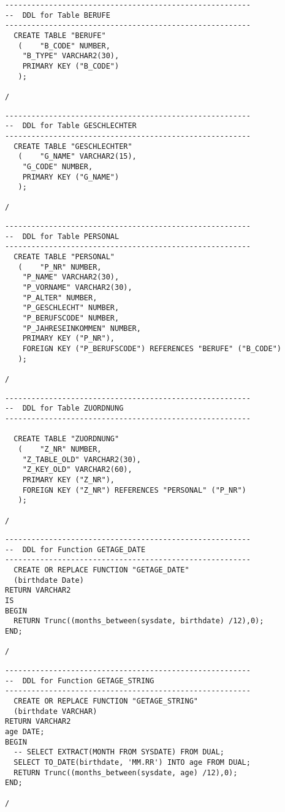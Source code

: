 \documentclass{scrartcl}
\begin{document}
\begin{lstlisting}
--------------------------------------------------------
--  DDL for Table BERUFE
--------------------------------------------------------
  CREATE TABLE "BERUFE" 
   (	"B_CODE" NUMBER, 
	"B_TYPE" VARCHAR2(30),
	PRIMARY KEY ("B_CODE")
   );

/
\end{lstlisting}

\begin{lstlisting}
--------------------------------------------------------
--  DDL for Table GESCHLECHTER
--------------------------------------------------------
  CREATE TABLE "GESCHLECHTER" 
   (	"G_NAME" VARCHAR2(15), 
	"G_CODE" NUMBER,
	PRIMARY KEY ("G_NAME")
   );

/
\end{lstlisting}

\begin{lstlisting}
--------------------------------------------------------
--  DDL for Table PERSONAL
--------------------------------------------------------
  CREATE TABLE "PERSONAL" 
   (	"P_NR" NUMBER, 
	"P_NAME" VARCHAR2(30), 
	"P_VORNAME" VARCHAR2(30), 
	"P_ALTER" NUMBER, 
	"P_GESCHLECHT" NUMBER, 
	"P_BERUFSCODE" NUMBER, 
	"P_JAHRESEINKOMMEN" NUMBER,
	PRIMARY KEY ("P_NR"),
	FOREIGN KEY ("P_BERUFSCODE") REFERENCES "BERUFE" ("B_CODE")
   );

/
\end{lstlisting}

\begin{lstlisting}
--------------------------------------------------------
--  DDL for Table ZUORDNUNG
--------------------------------------------------------

  CREATE TABLE "ZUORDNUNG" 
   (	"Z_NR" NUMBER, 
	"Z_TABLE_OLD" VARCHAR2(30), 
	"Z_KEY_OLD" VARCHAR2(60),
	PRIMARY KEY ("Z_NR"),
	FOREIGN KEY ("Z_NR") REFERENCES "PERSONAL" ("P_NR")
   );

/
\end{lstlisting}

\begin{lstlisting}
--------------------------------------------------------
--  DDL for Function GETAGE_DATE
--------------------------------------------------------
  CREATE OR REPLACE FUNCTION "GETAGE_DATE" 
  (birthdate Date)
RETURN VARCHAR2
IS
BEGIN
  RETURN Trunc((months_between(sysdate, birthdate) /12),0);
END;

/
\end{lstlisting}

\begin{lstlisting}
--------------------------------------------------------
--  DDL for Function GETAGE_STRING
--------------------------------------------------------
  CREATE OR REPLACE FUNCTION "GETAGE_STRING" 
  (birthdate VARCHAR)
RETURN VARCHAR2
age DATE;
BEGIN
  -- SELECT EXTRACT(MONTH FROM SYSDATE) FROM DUAL;
  SELECT TO_DATE(birthdate, 'MM.RR') INTO age FROM DUAL;
  RETURN Trunc((months_between(sysdate, age) /12),0);
END;

/
\end{lstlisting}
\end{document}
